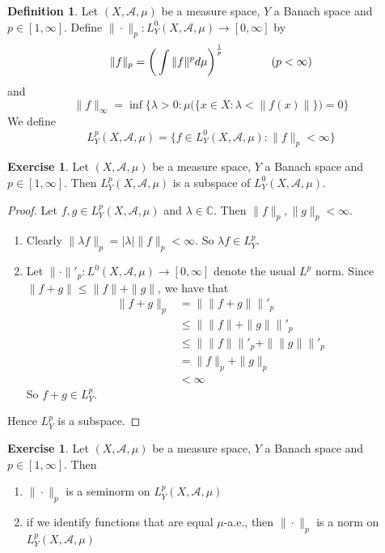 \documentclass{book}
\theoremstyle{definition}
\newtheorem{defn}[definition]{Definition}
\newtheorem{ex}[definition]{Exercise}
\newcommand{\lam}{\lambda}
\newcommand{\C}{\mathbb{C}}
\newcommand{\MA}{\mathcal{A}}
\newcommand{\lex}[1]{\label{ex:#1}}
\newcommand{\ld}[1]{\label{defn:#1}}
\DeclareMathOperator*{\0}{\mbf{0}}
\DeclareMathOperator*{\1}{\mbf{1}}
\newcommand{\RG}{[0,\infty]}
\begin{document}
	\begin{defn} \ld{00000} 
		Let $(X, \MA, \mu)$ be a measure space, $Y$ a Banach space and $p \in [1, \infty]$. Define $  \| \cdot \|_p : L_Y^0(X, \MA, \mu) \rightarrow [0, \infty]$ by $$\|f \|_p = \bigg(\int  \|f\|^p d\mu \bigg)^{\frac{1}{p}} \hspace{1.5cm}( p < \infty)$$ 
		and 
		$$\|f \|_{\infty} = \inf \bigg \{\lam >0: \mu\big(\{x \in X: \lam < \|f(x)\|  \}\big) = 0 \bigg \} $$
		We define $$L_Y^p(X, \MA, \mu) =  \{f \in L_Y^0(X, \MA, \mu): \|f \|_p < \infty \}$$
	\end{defn}	
	
	\begin{ex} \lex{00000} 
	Let $(X, \MA, \mu)$ be a measure space, $Y$ a Banach space and $p \in [1, \infty]$. Then $L_Y^p(X, \MA, \mu)$ is a subspace of $L_Y^0(X, \MA, \mu)$. 
	\end{ex}
	
	\begin{proof}Let $f, g \in L^p_Y(X, \MA, \mu)$ and $\lam \in \C$. Then $\|f\|_p, \|g\|_p < \infty$.
	\begin{enumerate}
	\item Clearly $\|\lam f\|_p = |\lam|\|f\|_p < \infty$.
	So $\lam f \in L^p_Y$.
	\item Let $\|\cdot \|'_p: L^0(X, \MA, \mu) \rightarrow \RG$ denote the usual $L^p$ norm. Since $\|f + g\| \leq \|f\| + \|g\|$, we have that 
	\begin{align*}
	\|f+g\|_p 
	&= \| \|f+g\| \|'_p \\
	& \leq \|\|f\| + \|g\| \|'_p \\
	& \leq  \|\|f\| \|'_p + \|\|g\| \|'_p \\
	&= \|f \|_p + \|g\|_p \\
	& < \infty
\end{align*}	
So $f+g \in L^p_Y$.
	\end{enumerate}
	Hence $L^p_Y$ is a subspace.
	\end{proof}
	
	\begin{ex} \lex{00000} 
	Let $(X, \MA, \mu)$ be a measure space, $Y$ a Banach space and $p \in [1, \infty]$. Then 
	\begin{enumerate}
	\item $\|\cdot\|_p$ is a seminorm on $L^p_Y(X, \MA, \mu)$
	\item if we identify functions that are equal $\mu$-a.e., then $\|\cdot\|_p$ is a norm on $L^p_Y(X, \MA, \mu)$
	\end{enumerate}
	\end{ex}
	
\end{document}
